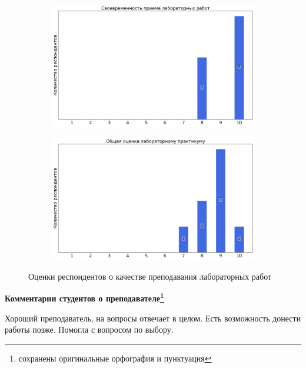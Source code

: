 \begin{figure}[H]
\begin{subfigure}[b]{0.45\textwidth}
            \end{subfigure}
            \begin{subfigure}[b]{0.45\textwidth}
                \centering
                \includegraphics[width=\textwidth]{images/1 course/Общая физика - механика/labniks-marks-Долгих Е.А.-2.png}
            \end{subfigure}
            \begin{subfigure}[b]{0.45\textwidth}
                \centering
                \includegraphics[width=\textwidth]{images/1 course/Общая физика - механика/labniks-marks-Долгих Е.А.-3.png}
            \end{subfigure}	
            \caption{Оценки респондентов о качестве преподавания лабораторных работ}
        \end{figure}

        \textbf{Комментарии студентов о преподавателе\protect\footnote{сохранены оригинальные орфография и пунктуация}}
            \begin{commentbox} 
                Хороший преподаватель, на вопросы отвечает в целом. Есть возможность донести работы позже. Помогла с вопросом по выбору. 
            \end{commentbox} 


